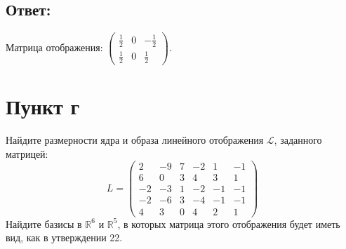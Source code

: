 \documentclass[12pt]{article}
\begin{document}
    \subsection*{Ответ:}
    Матрица отображения:
    $
    \begin{pmatrix}
        \frac{1}{2} & 0 & - \frac{1}{2} \\
        \frac{1}{2} & 0 & \frac{1}{2}
    \end{pmatrix}
    $.

    \section*{Пункт г}
    Найдите размерности ядра и образа линейного отображения $\mathcal{L}$, заданного матрицей:
    \[
        L
        =
        \begin{pmatrix}
            2  & -9 & 7 & -2 & 1  & -1 \\
            6  & 0  & 3 & 4  & 3  & 1  \\
            -2 & -3 & 1 & -2 & -1 & -1 \\
            -2 & -6 & 3 & -4 & -1 & -1 \\
            4  & 3  & 0 & 4  & 2  & 1
        \end{pmatrix}
    \]
    Найдите базисы в $\mathbb{R}^6$ и $\mathbb{R}^5$, в которых матрица этого отображения будет иметь вид, как в утверждении 22.
\end{document}
